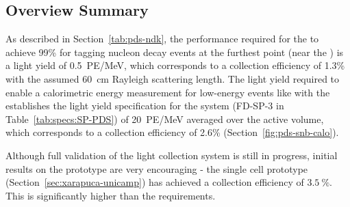 



\subsection{Overview Summary} 
\label{sec:fdsp-pd-ov-summ}

As described in Section~\ref{tab:pds-ndk}, the performance required for the  to achieve 99\% for tagging nucleon decay events at the furthest point (near the ) is a light yield of \SI{0.5}{PE/MeV}, which corresponds to a collection efficiency of 1.3\% with the assumed \SI{60}{cm} Rayleigh scattering length. The light yield required to enable a calorimetric energy measurement for low-energy events like  with the  establishes the light yield specification for the system (FD-SP-3 in Table~\ref{tab:specs:SP-PDS}) of \SI{20}{PE/MeV} averaged over the active volume, which corresponds to a collection efficiency of 2.6\% (Section~\ref{fig:pds-snb-calo}).

Although full validation of the   light collection system is still in progress, initial results on the  prototype are very encouraging - the single cell prototype (Section~\ref{sec:xarapuca-unicamp}) has achieved a collection efficiency of $\SI{3.5}{\%}$.  This is significantly higher than the requirements.

